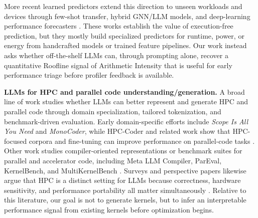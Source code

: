 More recent learned predictors extend this direction to unseen workloads and devices through few-shot transfer, hybrid GNN/LLM models, and deep-learning performance forecasters \cite{deyRelativePerformancePrediction2024,leeForecastingGPUPerformance2025,selvamCanLLMsEnhance2024,pannerselvamPerformancePredictionModels2025}.
These works establish the value of execution-free prediction, but they mostly build specialized predictors for runtime, power, or energy from handcrafted models or trained feature pipelines.
Our work instead asks whether off-the-shelf LLMs can, through prompting alone, recover a quantitative Roofline signal of Arithmetic Intensity that is useful for early performance triage before profiler feedback is available.

\textbf{LLMs for HPC and parallel code understanding/generation.}
A broad line of work studies whether LLMs can better represent and generate HPC and parallel code through domain specialization, tailored tokenization, and benchmark-driven evaluation.
Early domain-specific efforts include \textit{Scope Is All You Need} and \textit{MonoCoder}, while HPC-Coder and related work show that HPC-focused corpora and fine-tuning can improve performance on parallel-code tasks \cite{talkadoshScopeAllYou2023,talkadoshMonoCoderDomainSpecificCode2023,danielnicholsModelingParallelPrograms2023,nicholsHPCCoderModelingParallel2024a}.
Other work studies compiler-oriented representations or benchmark suites for parallel and accelerator code, including Meta LLM Compiler, ParEval, KernelBench, and MultiKernelBench \cite{cumminsMetaLargeLanguage2024a,nicholsCanLargeLanguage2024,ouyangKernelBenchCanLLMs2025,wenMultiKernelBenchMultiPlatformBenchmark2025}.
Surveys and perspective papers likewise argue that HPC is a distinct setting for LLMs because correctness, hardware sensitivity, and performance portability all matter simultaneously \cite{chenLandscapeChallengesHPC2024,gongLanguageModelsCode2025}.
Relative to this literature, our goal is not to generate kernels, but to infer an interpretable performance signal from existing kernels before optimization begins.

